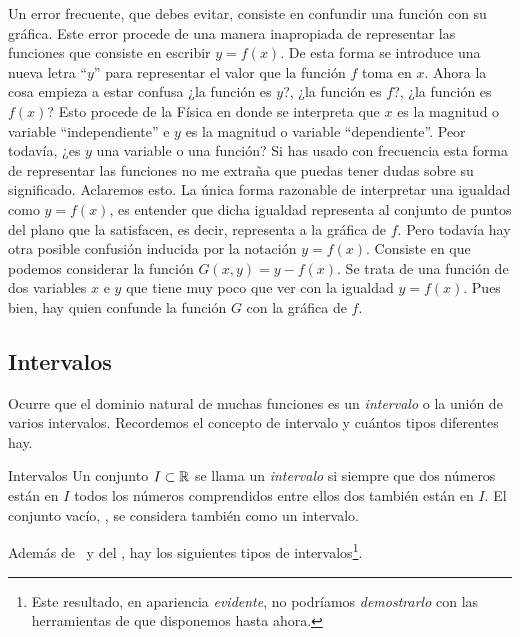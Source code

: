 \documentclass[oneside,spanish,2m,twoside,svgnames,x11names,HTML,12pt]{libro-matua}\usepackage[]{graphicx}\usepackage[]{color}
\begin{document}
Un error \marginpar{\flushright\curvasr} frecuente, que debes evitar,
consiste en confundir una función con su gráfica. Este error procede
de una manera inapropiada de representar las funciones que consiste
en escribir $y=f(x)$. De esta forma se introduce una nueva letra
``$y$'' para representar el valor que la función $f$ toma en $x$.
Ahora la cosa empieza a estar confusa ¿la función es $y$?, ¿la función
es $f$?, ¿la función es $f(x)$? Esto procede de la Física en donde
se interpreta que $x$ es la magnitud o variable ``independiente''
e $y$ es la magnitud o variable ``dependiente''. Peor todavía,
¿es $y$ una variable o una función? Si has usado con frecuencia esta
forma de representar las funciones no me extraña que puedas tener
dudas sobre su significado. Aclaremos esto. La única forma razonable
de interpretar una igualdad como $y=f(x)$, es entender que dicha
igualdad representa al conjunto de puntos del plano que la satisfacen,
es decir, representa a la gráfica de $f$. Pero todavía hay otra posible
confusión inducida por la notación $y=f(x)$. Consiste en que podemos
considerar la función $G(x,y)=y-f(x)$. Se trata de una función de
dos variables $x$ e $y$ que tiene muy poco que ver con la igualdad
$y=f(x)$. Pues bien, hay quien confunde la función $G$ con la gráfica
de $f$.

\subsection{Intervalos}

Ocurre que el dominio natural de muchas funciones es un \emph{intervalo}
o la unión de varios intervalos. Recordemos el concepto de intervalo
y cuántos tipos diferentes hay.

\begin{defi}{Intervalos}{}\label{definicionintervalo} Un conjunto
$I\subset\mathbb R$ se llama un \emph{intervalo} si siempre que dos números
están en $I$ todos los números comprendidos entre ellos dos también
están en $I$. El conjunto vacío, \vac, se considera también como
un intervalo. \end{defi}

Además de \R\ y del \vac, hay los siguientes tipos de intervalos\footnote{Este resultado, en apariencia \emph{evidente}, no podríamos \emph{demostrarlo}
con las herramientas de que disponemos hasta ahora.}.
\end{document}
